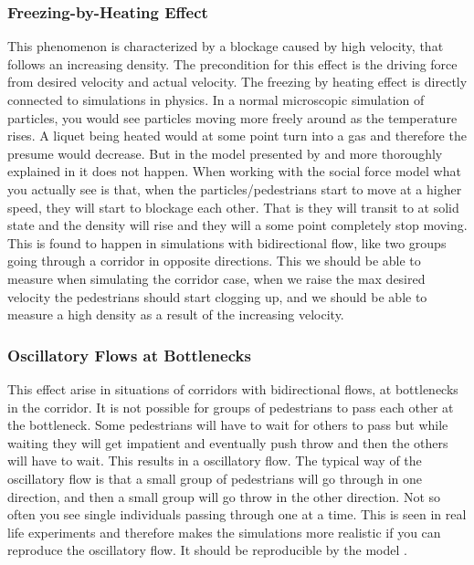 \subsubsection{Freezing-by-Heating Effect}
This phenomenon is characterized by a blockage caused by high velocity,
that follows an increasing density. The precondition for this effect is the driving force from desired
velocity and actual velocity. The freezing by heating effect is directly connected to simulations in
physics\cite{frebyheat}. In a
normal microscopic simulation of particles, you would see particles moving more freely around as the temperature rises. A liquet being heated would at some point turn into a gas and therefore the presume would decrease.
But in the model presented by \cite{self-org} and more thoroughly explained in \cite{frebyheat}
it does not happen. When working with the social force model what you actually see is that, when the
particles/pedestrians start to move at a higher speed, they will start to blockage each other.
That is they will transit to at solid state and the density will rise and they will a some point
completely stop moving. This is found to happen in simulations with bidirectional flow, like
two groups going through a corridor in opposite directions.
This we should be able to measure when simulating the corridor case, when we raise the max desired
velocity the pedestrians should start clogging up, and we should be able to measure a high density as
a result of the increasing velocity.


\subsubsection{Oscillatory Flows at Bottlenecks}
This effect arise in situations of corridors with bidirectional flows, at bottlenecks in the corridor.
It is not possible for groups of pedestrians to pass each other at the bottleneck. Some pedestrians will have to wait for others to pass but while waiting they will get impatient and eventually push throw and then the others will have to wait. This results in a oscillatory flow.
The typical way of the oscillatory flow is that a small group of pedestrians will go through in one direction, and then a small group will go throw in the other direction.
Not so often you see single individuals passing through one at a time.
This is seen in real life experiments and therefore makes the simulations more realistic
if you can reproduce the oscillatory flow.
It should be reproducible by the model \cite{self-org}.

